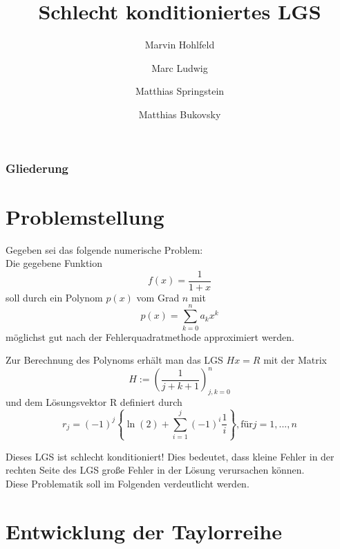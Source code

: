 \documentclass{beamer}
\title{Schlecht konditioniertes LGS}
\author[M. Hohlfeld\and M. Ludwig\and M. Springstein \and M. Bukovsky]
  {Marvin Hohlfeld\and Marc Ludwig\and Matthias Springstein\and Matthias Bukovsky}
\begin{document}
  \begin{frame}
    \titlepage
  \end{frame}

  \begin{frame}
    \frametitle{Gliederung}\tableofcontents
  \end{frame}

  \section{Problemstellung}
  \begin{frame}
    Gegeben sei das folgende numerische Problem: \\[1em]
    
    Die gegebene Funktion 
    \begin{equation}
      f(x) = \frac{1}{1+x}
    \end{equation}  
    soll durch ein Polynom $p(x)$ vom Grad $n$ mit
    \begin{equation}
      p(x) = \sum_{k=0}^n a_k x^k
    \end{equation}
    möglichst gut nach der Fehlerquadratmethode approximiert werden.
  \end{frame}
  \begin{frame}
    Zur Berechnung des Polynoms erhält man das LGS $Hx=R$ mit der Matrix \\
    \begin{equation}
    H := \left(\frac{1}{j+k+1}\right)_{j,k=0}^n
    \end{equation}
    und dem Lösungsvektor R definiert durch \\
    \begin{equation}
    r_j = (-1)^j \left\{ \ln(2)  + \sum_{i=1}^j (-1)^i \frac{1}{i} \right\}, \text{für} j = 1,...,n
    \end{equation}

    Dieses LGS ist schlecht konditioniert! Dies bedeutet, dass kleine Fehler in der rechten Seite des LGS große Fehler in der Lösung verursachen können.
    \\[1em]
    Diese Problematik soll im Folgenden verdeutlicht werden.
  \end{frame}
  
  \section{Entwicklung der Taylorreihe}
\end{document}
